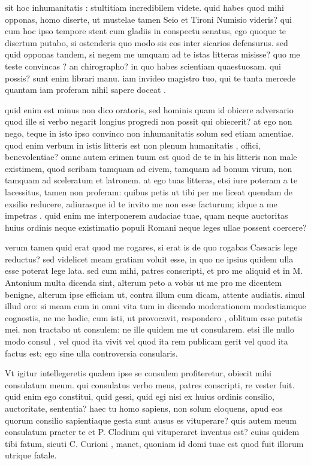 sit hoc inhumanitatis : stultitiam incredibilem videte. quid habes quod mihi opponas, homo diserte, ut mustelae tamen Seio et Tironi Numisio videris? qui cum hoc ipso tempore stent cum gladiis in conspectu senatus, ego quoque te disertum putabo, si ostenderis quo modo sis eos inter sicarios defensurus. sed quid opponas tandem, si negem me umquam ad te istas litteras misisse? quo me teste convincas ? an chirographo? in quo habes scientiam quaestuosam. qui possis? sunt enim librari manu. iam invideo magistro tuo, qui te tanta mercede quantam iam proferam nihil sapere doceat .

 quid enim est minus non dico oratoris, sed hominis quam id obicere adversario quod ille si verbo negarit longius progredi non possit qui obiecerit? at ego non nego, teque in isto ipso convinco non inhumanitatis solum sed etiam amentiae. quod enim verbum in istis litteris est non plenum humanitatis , offici, benevolentiae? omne autem crimen tuum est quod de te in his litteris non male existimem, quod scribam tamquam ad civem, tamquam ad bonum virum, non tamquam ad sceleratum et latronem. at ego tuas litteras, etsi iure poteram a te lacessitus, tamen non proferam: quibus petis ut tibi per me liceat quendam de exsilio reducere, adiurasque id te invito me non esse facturum; idque a me impetras . quid enim me interponerem audaciae tuae, quam neque auctoritas huius ordinis neque existimatio populi Romani neque leges ullae possent coercere?

 verum tamen quid erat quod me rogares, si erat is de quo rogabas Caesaris lege reductus? sed videlicet meam gratiam voluit esse, in quo ne ipsius quidem ulla esse poterat lege lata. sed cum mihi, patres conscripti, et pro me aliquid et in M. Antonium multa dicenda sint, alterum peto a vobis ut me pro me dicentem benigne, alterum ipse efficiam ut, contra illum cum dicam, attente audiatis. simul illud oro: si meam cum in omni vita tum in dicendo moderationem modestiamque cognostis, ne me hodie, cum isti, ut provocavit, respondero , oblitum esse putetis mei. non tractabo ut consulem: ne ille quidem me ut consularem. etsi ille nullo modo consul , vel quod ita vivit vel quod ita rem publicam gerit vel quod ita factus est; ego sine ulla controversia consularis.

 Vt igitur intellegeretis qualem ipse se consulem profiteretur, obiecit mihi consulatum meum. qui consulatus verbo meus, patres conscripti, re vester fuit. quid enim ego constitui, quid gessi, quid egi nisi ex huius ordinis consilio, auctoritate, sententia? haec tu homo sapiens, non solum eloquens, apud eos quorum consilio sapientiaque gesta sunt ausus es vituperare? quis autem meum consulatum praeter te et P. Clodium qui vituperaret inventus est? cuius quidem tibi fatum, sicuti C. Curioni , manet, quoniam id domi tuae est quod fuit illorum utrique fatale.

